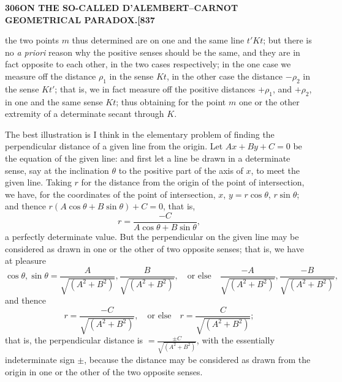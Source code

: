 \documentclass[12pt,a4paper]{article}
\theoremstyle{definition}
\begin{document}
\newpage
\setcounter{page}{306}

\noindent\textbf{306}\hfill\textbf{ON THE SO-CALLED D'ALEMBERT--CARNOT GEOMETRICAL PARADOX.}\hfill\textbf{[837}

\bigskip

\noindent the two points $m$ thus determined are on one and the same line $t'Kt$; but there is no \textit{a priori} reason why the positive senses should be the same, and they are in fact opposite to each other, in the two cases respectively; in the one case we measure off the distance $\rho_1$ in the sense $Kt$, in the other case the distance $-\rho_2$ in the sense $Kt'$; that is, we in fact measure off the positive distances $+\rho_1$, and $+\rho_2$, in one and the same sense $Kt$; thus obtaining for the point $m$ one or the other extremity of a determinate secant through $K$.

The best illustration is I think in the elementary problem of finding the perpendicular distance of a given line from the origin. Let $Ax + By + C = 0$ be the equation of the given line: and first let a line be drawn in a determinate sense, say at the inclination $\theta$ to the positive part of the axis of $x$, to meet the given line. Taking $r$ for the distance from the origin of the point of intersection, we have, for the coordinates of the point of intersection, $x$, $y = r\cos\theta$, $r\sin\theta$; and thence $r(A\cos\theta + B\sin\theta) + C = 0$, that is,
\[
r = \frac{-C}{A\cos\theta + B\sin\theta},
\]
a perfectly determinate value. But the perpendicular on the given line may be considered as drawn in one or the other of two opposite senses; that is, we have at pleasure
\[
\cos\theta, \sin\theta = \frac{A}{\sqrt{(A^2 + B^2)}}, \frac{B}{\sqrt{(A^2 + B^2)}}, \quad \text{or else} \quad \frac{-A}{\sqrt{(A^2 + B^2)}}, \frac{-B}{\sqrt{(A^2 + B^2)}},
\]
and thence
\[
r = \frac{-C}{\sqrt{(A^2 + B^2)}}, \quad \text{or else} \quad r = \frac{C}{\sqrt{(A^2 + B^2)}};
\]
that is, the perpendicular distance is $= \frac{\pm C}{\sqrt{(A^2 + B^2)}}$, with the essentially indeterminate sign $\pm$, because the distance may be considered as drawn from the origin in one or the other of the two opposite senses.

\vspace{2em}


\newpage
\setcounter{page}{307}
\end{document}
